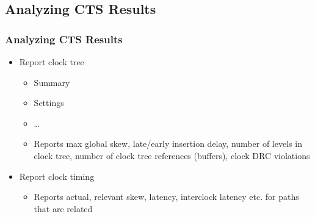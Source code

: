 \documentclass[compress]{beamer}
\begin{document}
\subsection[Results]{Analyzing CTS Results}
\begin{frame}
	\frametitle{Analyzing CTS Results}
	\begin{itemize}
		\item Report clock tree 
		\begin{itemize}
			\item Summary
			\item Settings
			\item …
			\item Reports max global skew, late/early insertion delay, number of levels in clock tree, number of clock tree references (buffers), clock DRC violations
		\end{itemize}
		\item Report clock timing
		\begin{itemize}
			\item Reports actual, relevant skew, latency, interclock latency etc. for paths that are related
		\end{itemize}
	\end{itemize}
\end{frame}
\end{document}
